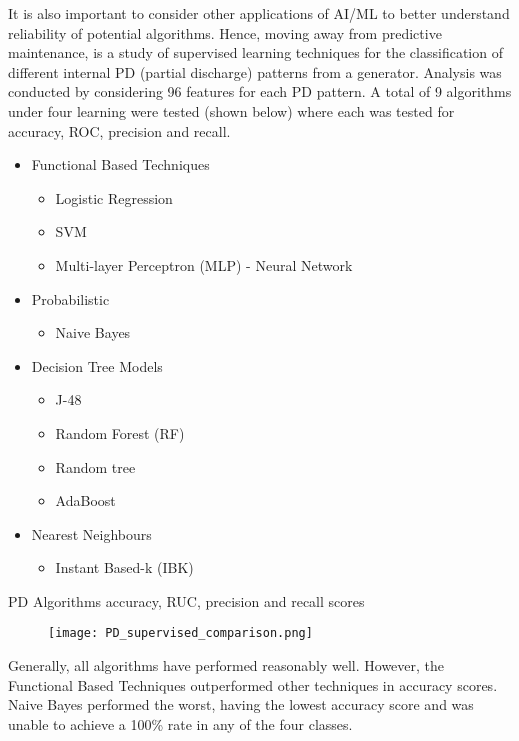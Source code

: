 \bigskip
It is also important to consider other applications of AI/ML to better understand reliability of potential algorithms.
Hence, moving away from predictive maintenance, \cite{8300383} is a study of supervised learning techniques for the classification of different internal PD (partial discharge) patterns from a generator.
Analysis was conducted by considering 96 features for each PD pattern.
A total of 9 algorithms under four learning were tested (shown below) where each was tested for accuracy, ROC, precision and recall.

\begin{itemize}
    \item Functional Based Techniques
    \begin{itemize}
        \item Logistic Regression
        \item SVM
        \item Multi-layer Perceptron (MLP) - Neural Network
    \end{itemize}
    \item Probabilistic
    \begin{itemize}
        \item Naive Bayes
    \end{itemize}
    \item Decision Tree Models
    \begin{itemize}
        \item J-48
        \item Random Forest (RF)
        \item Random tree
        \item AdaBoost
    \end{itemize}
    \item Nearest Neighbours
    \begin{itemize}
        \item Instant Based-k (IBK)
    \end{itemize}
\end{itemize}

\bigskip
\begin{table}[h]
    \caption{PD Algorithms accuracy, RUC, precision and recall scores \cite{8300383}}
    \begin{figure}[H]
        \texttt{[image: PD\_supervised\_comparison.png]}
        \centering
    \end{figure}
    \label{fig:PD_table}
\end{table}

Generally, all algorithms have performed reasonably well. However, the Functional Based Techniques outperformed other techniques in accuracy scores. 
Naive Bayes performed the worst, having the lowest accuracy score and was unable to achieve a 100\% rate in any of the four classes.


